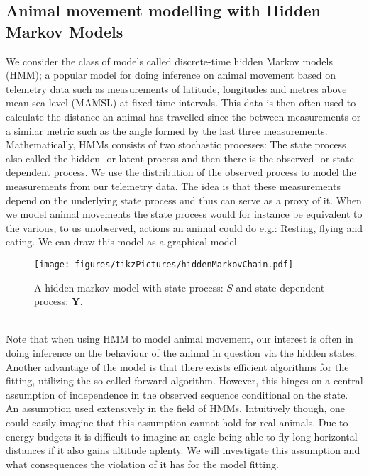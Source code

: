
\subsection*{Animal movement modelling with Hidden Markov Models}
We consider the class of models called discrete-time hidden Markov models (HMM); a popular model for doing inference on animal movement based on telemetry data such as measurements of latitude, longitudes and metres above mean sea level (MAMSL) at fixed time intervals. This data is then often used to calculate the distance an animal has travelled since the between measurements or a similar metric such as the angle formed by the last three measurements.\\ Mathematically, HMMs consists of two stochastic processes: The state process also called the hidden- or latent process and then there is the observed- or state-dependent process. 
We use the distribution of the observed process to model the measurements from our telemetry data. The idea is that these measurements depend on the underlying state process and thus can serve as a proxy of it. When we model animal movements the state process would for instance be equivalent to the various, to us unobserved, actions an animal could do e.g.: Resting, flying and eating. We can draw this model as a graphical model
\begin{figure}[h]
    \centering
    \texttt{[image: figures/tikzPictures/hiddenMarkovChain.pdf]}
    \caption{A hidden markov model with state process: $S$ and state-dependent process: $\mathbf{Y}$.}
\end{figure}\\
Note that when using HMM to model animal movement, our interest is often in doing inference on the behaviour of the animal in question via the hidden states. Another advantage of the model is that there exists efficient algorithms for the fitting, utilizing the so-called forward algorithm. However, this hinges on a central assumption of independence in the observed sequence conditional on the state. An assumption used extensively in the field of HMMs. Intuitively though, one could easily imagine that this assumption cannot hold for real animals. Due to energy budgets it is difficult to imagine an eagle being able to fly long horizontal distances if it also gains altitude aplenty. We will investigate this assumption and what consequences the violation of it has for the model fitting.